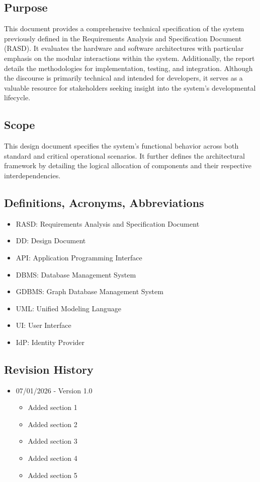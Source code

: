 \subsection{Purpose}
This document provides a comprehensive technical specification of the system previously defined in the Requirements Analysis and Specification Document (RASD). It evaluates the hardware and software architectures with particular emphasis on the modular interactions within the system. Additionally, the report details the methodologies for implementation, testing, and integration. Although the discourse is primarily technical and intended for developers, it serves as a valuable resource for stakeholders seeking insight into the system’s developmental lifecycle.
\subsection{Scope}
This design document specifies the system's functional behavior across both standard and critical operational scenarios. It further defines the architectural framework by detailing the logical allocation of components and their respective interdependencies.

\subsection{Definitions, Acronyms, Abbreviations}

\begin{itemize}
\item
RASD: Requirements Analysis and Specification Document
\item
DD: Design Document
\item
API: Application Programming Interface
\item
DBMS: Database Management System
\item
GDBMS: Graph Database Management System
\item
UML: Unified Modeling Language
\item
UI: User Interface
\item
IdP: Identity Provider


\end{itemize}
\subsection{Revision History}

\begin{itemize}
    \item 07/01/2026 - Version 1.0
    \begin{itemize}[label = +]
        \item Added section 1 
        \item Added section 2
        \item Added section 3 
        \item Added section 4
        \item Added section 5
    \end{itemize}
\end{itemize}

